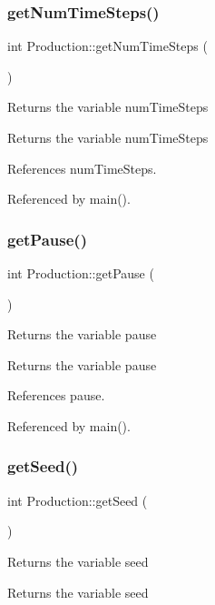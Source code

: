 \subsubsection{get\+Num\+Time\+Steps()}
{\footnotesize\ttfamily int Production\+::get\+Num\+Time\+Steps (\begin{DoxyParamCaption}{ }\end{DoxyParamCaption})}

Returns the variable num\+Time\+Steps \begin{DoxyReturn}{Returns}
the variable num\+Time\+Steps 
\end{DoxyReturn}


References num\+Time\+Steps.



Referenced by main().

\mbox{\label{classProduction_a47e42a05b46864c76b8998e192e73785}} 
\subsubsection{get\+Pause()}
{\footnotesize\ttfamily int Production\+::get\+Pause (\begin{DoxyParamCaption}{ }\end{DoxyParamCaption})}

Returns the variable pause \begin{DoxyReturn}{Returns}
the variable pause 
\end{DoxyReturn}


References pause.



Referenced by main().

\mbox{\label{classProduction_a609b65699acae950471e0d695dda3bb7}} 
\subsubsection{get\+Seed()}
{\footnotesize\ttfamily int Production\+::get\+Seed (\begin{DoxyParamCaption}{ }\end{DoxyParamCaption})}

Returns the variable seed \begin{DoxyReturn}{Returns}
the variable seed 
\end{DoxyReturn}


